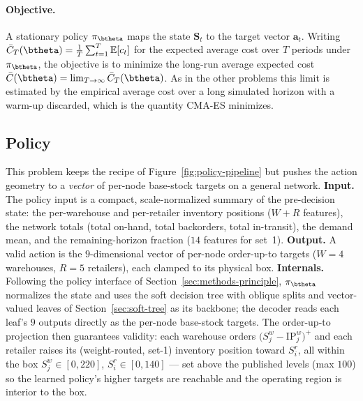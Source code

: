 \paragraph{Objective.}
A stationary policy $\pi_{\btheta}$ maps the state $\mathbf S_t$ to the target vector $\mathbf a_t$.
Writing $\bar C_T(\btheta)=\tfrac1T\sum_{t=1}^{T}\mathbb E[c_t]$ for the expected average cost over $T$
periods under $\pi_{\btheta}$, the objective is to minimize the long-run average expected cost
$\bar C(\btheta)=\lim_{T\to\infty}\bar C_T(\btheta)$. As in the other problems this limit is estimated
by the empirical average cost over a long simulated horizon with a warm-up discarded, which is the
quantity CMA-ES minimizes.

\FloatBarrier

\subsection{Policy}
\label{sec:gbk-policy}

This problem keeps the recipe of Figure~\ref{fig:policy-pipeline} but pushes the action geometry to a
\emph{vector} of per-node base-stock targets on a general network. \textbf{Input.} The policy input is
a compact, scale-normalized summary of the pre-decision state: the per-warehouse and per-retailer
inventory positions ($W+R$ features), the network totals (total on-hand, total backorders, total
in-transit), the demand mean, and the remaining-horizon fraction ($14$ features for set~1).
\textbf{Output.} A valid action is the $9$-dimensional vector of per-node order-up-to targets
($W{=}4$ warehouses, $R{=}5$ retailers), each clamped to its physical box. \textbf{Internals.}
Following the policy interface of Section~\ref{sec:methods-principle}, $\pi_{\btheta}$ normalizes the
state and uses the soft decision tree with oblique splits and vector-valued leaves of
Section~\ref{sec:soft-tree} as its backbone; the decoder reads each leaf's $9$ outputs directly as the
per-node base-stock targets. The order-up-to projection then guarantees validity: each warehouse
orders $\big(S^w_{j}-\mathrm{IP}^w_{j}\big)^+$ and each retailer raises its (weight-routed, set-1)
inventory position toward $S^r_{i}$, all within the box $S^w_j\in[0,220]$, $S^r_i\in[0,140]$ --- set
above the published levels (max $100$) so the learned policy's higher targets are reachable and the
operating region is interior to the box.

